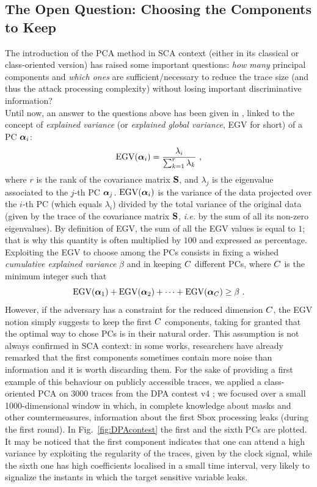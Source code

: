 \subsection{The Open Question: Choosing the Components to Keep}\label{sec:ELV}
The introduction of the PCA method in SCA context (either in its classical or class-oriented version)  has raised some important questions: \textit{how many} principal components and \textit{which ones} are sufficient/necessary to reduce the trace size (and thus the attack processing complexity) without losing important discriminative information?\\

Until now, an answer to the questions above has been given in \cite{choudary2014efficient}, linked to the concept of {\em explained variance} (or {\em explained global variance}, EGV for short) of a PC $\boldsymbol\alpha_i$:
\begin{equation}\label{eq:EGV}
\mathrm{EGV}(\boldsymbol\alpha_i) =  \frac{\lambda_i}{\sum_{k=1}^r\lambda_k} \mbox{ ,}
\end{equation}
where $r$ is the rank of the covariance matrix $\textbf{S}$, and $\lambda_j$ is the eigenvalue associated to the $j$-th PC $\boldsymbol\alpha_j$. $\mathrm{EGV}(\boldsymbol\alpha_i)$ is the variance of the data projected over the $i$-th PC (which equals $\lambda_i$) divided by the total variance of the original data (given by the trace of the covariance matrix $\textbf{S}$, {\em i.e.} by the sum of all its non-zero eigenvalues). By definition of EGV, the sum of all the EGV values is equal to $1$; that is why this quantity is often multiplied by $100$ and expressed as percentage.
Exploiting the EGV to choose among the PCs consists in fixing a wished {\em cumulative explained variance} $\beta$ and in keeping $C$ different PCs, where $C$ is the minimum integer such that
\begin{equation}
\mbox{EGV}(\boldsymbol\alpha_1) +\mbox{EGV}(\boldsymbol\alpha_2) + \dots +\mbox{EGV}(\boldsymbol\alpha_C) \geq \beta \mbox{ .}
\end{equation}
However, if the adversary has a constraint for the reduced dimension $C$, the EGV notion simply suggests to keep the first $C$ components, taking for granted that the optimal way to chose PCs is in their natural order. This assumption is not always confirmed in SCA context: in some works, researchers have already remarked that the first components sometimes contain more noise than information \cite{Batina2012,specht} and it is worth discarding them. For the sake of providing a first example of this behaviour on publicly accessible traces, we applied a class-oriented PCA on 3000 traces from the DPA contest v4 \cite{DPAcontest}; we focused over a small 1000-dimensional window in which, in complete knowledge about masks and other countermeasures, information about the first Sbox processing leaks (during the first round). In Fig.~\ref{fig:DPAcontest} the first and the sixth PCs are plotted. It may be noticed that the first component indicates that one can attend a high variance by exploiting the regularity of the traces, given by the clock signal, while the sixth one has high coefficients localised in a small time interval, very likely to signalize the instants in which the target sensitive variable leaks.

